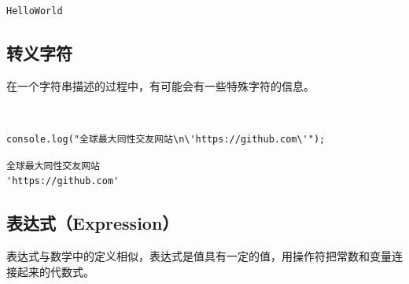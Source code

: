 \begin{tcolorbox}
	\begin{verbatim}
HelloWorld
	\end{verbatim}
\end{tcolorbox}

\subsection{转义字符}

在一个字符串描述的过程中，有可能会有一些特殊字符的信息。

\begin{table}[H]
	\centering
	\caption{转义字符}
\end{table}

 \\

\begin{lstlisting}[style=htmlcssjs]
console.log("全球最大同性交友网站\n\'https://github.com\'");
\end{lstlisting}

\begin{tcolorbox}
	\begin{verbatim}
全球最大同性交友网站
'https://github.com'
	\end{verbatim}
\end{tcolorbox}

\subsection{表达式（Expression）}

表达式与数学中的定义相似，表达式是值具有一定的值，用操作符把常数和变量连接起来的代数式。 \\


